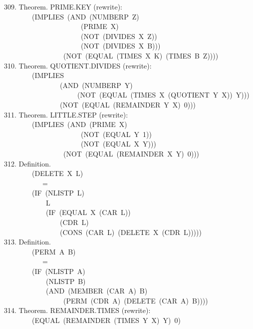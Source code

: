 \documentclass[10pt]{book}
\newenvironment{pubasis}{\begin{flushleft}}{\end{flushleft}}
\begin{document}
\begin{pubasis}
309.    Theorem.  PRIME.KEY (rewrite):\\
~~~~~~~~(IMPLIES~(AND~(NUMBERP~Z)\\
~~~~~~~~~~~~~~~~~~~~~~(PRIME~X)\\
~~~~~~~~~~~~~~~~~~~~~~(NOT~(DIVIDES~X~Z))\\
~~~~~~~~~~~~~~~~~~~~~~(NOT~(DIVIDES~X~B)))\\
~~~~~~~~~~~~~~~~~(NOT~(EQUAL~(TIMES~X~K)~(TIMES~B~Z))))\\

310.    Theorem.  QUOTIENT.DIVIDES (rewrite):\\
~~~~~~~~(IMPLIES\\
~~~~~~~~~~~~~~~~(AND~(NUMBERP~Y)\\
~~~~~~~~~~~~~~~~~~~~~(NOT~(EQUAL~(TIMES~X~(QUOTIENT~Y~X))~Y)))\\
~~~~~~~~~~~~~~~~(NOT~(EQUAL~(REMAINDER~Y~X)~0)))\\

311.    Theorem.  LITTLE.STEP (rewrite):\\
~~~~~~~~(IMPLIES~(AND~(PRIME~X)\\
~~~~~~~~~~~~~~~~~~~~~~(NOT~(EQUAL~Y~1))\\
~~~~~~~~~~~~~~~~~~~~~~(NOT~(EQUAL~X~Y)))\\
~~~~~~~~~~~~~~~~~(NOT~(EQUAL~(REMAINDER~X~Y)~0)))\\

312.    Definition.\\
~~~~~~~~(DELETE~X~L)\\
~~~~~~~~~~~=\\
~~~~~~~~(IF~(NLISTP~L)\\
~~~~~~~~~~~~L\\
~~~~~~~~~~~~(IF~(EQUAL~X~(CAR~L))\\
~~~~~~~~~~~~~~~~(CDR~L)\\
~~~~~~~~~~~~~~~~(CONS~(CAR~L)~(DELETE~X~(CDR~L)))))\\

313.    Definition.\\
~~~~~~~~(PERM~A~B)\\
~~~~~~~~~~~=\\
~~~~~~~~(IF~(NLISTP~A)\\
~~~~~~~~~~~~(NLISTP~B)\\
~~~~~~~~~~~~(AND~(MEMBER~(CAR~A)~B)\\
~~~~~~~~~~~~~~~~~(PERM~(CDR~A)~(DELETE~(CAR~A)~B))))\\

314.    Theorem.  REMAINDER.TIMES (rewrite):\\
~~~~~~~~(EQUAL~(REMAINDER~(TIMES~Y~X)~Y)~0)\\


\end{pubasis}
\end{document}
